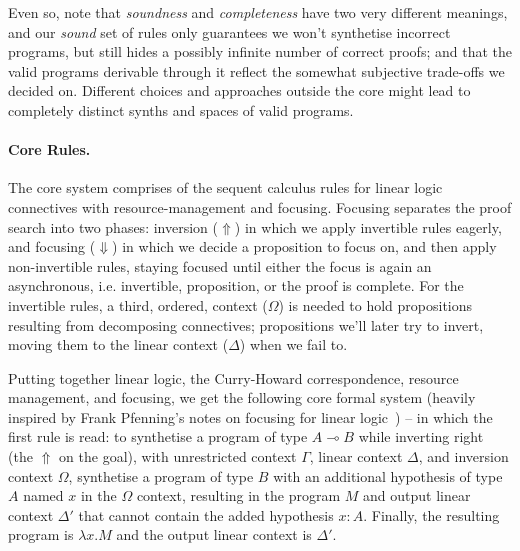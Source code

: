 \documentclass{llncs}
\newcommand{\lolli}{\multimap}
\newcommand{\mypara}[1]{\paragraph{\textbf{#1}.}}
\begin{document}
Even so, note that \emph{soundness} and \emph{completeness} have two very
different meanings, and our \emph{sound} set of rules only guarantees we won't
synthetise incorrect programs, but still hides a possibly infinite number of correct
proofs; and that the valid programs derivable through it reflect the somewhat
subjective trade-offs we decided on. Different choices and approaches outside
the core might lead to completely distinct synths and spaces of valid programs.


\mypara{Core Rules} The core system comprises of the sequent calculus rules for
linear logic connectives with resource-management and focusing.
Focusing separates the proof search into two
phases: inversion ($\Uparrow$) in which we apply invertible rules eagerly, and
focusing ($\Downarrow$) in which we decide a proposition to focus on, and then
apply non-invertible rules, staying focused until either the focus is again an
asynchronous, i.e. invertible, proposition, or the proof is complete.  For the
invertible rules, a third, ordered, context ($\Omega$) is needed to hold
propositions resulting from decomposing connectives; propositions we'll later try to
invert, moving them to the linear context ($\Delta$) when we fail to.


Putting together linear logic, the Curry-Howard correspondence, resource
management, and focusing, we get the following core formal system (heavily inspired
by Frank Pfenning's notes on focusing for linear logic~\cite{FPnotes...}) -- in which the
first rule is read: to synthetise a program of type $A \lolli B$ while inverting
right (the $\Uparrow$ on the goal), with unrestricted context $\Gamma$, linear
context $\Delta$, and inversion context $\Omega$, synthetise a program of type $B$ with
an additional hypothesis of type $A$ named $x$ in the $\Omega$ context,
resulting in the program $M$ and output linear
context $\Delta'$ that cannot contain the added hypothesis $x{:}A$. Finally, the
resulting program is $\lambda x . M$ and the output linear context is
$\Delta'$.
\end{document}
